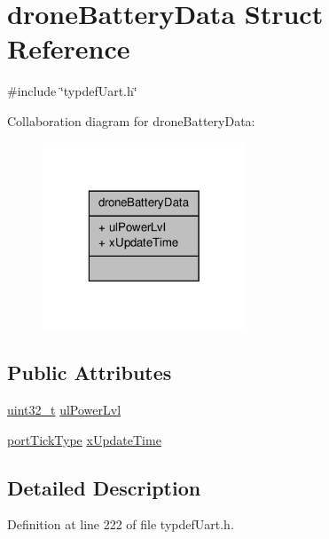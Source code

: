 \hypertarget{structdroneBatteryData}{\section{drone\-Battery\-Data Struct Reference}
\label{structdroneBatteryData}
}


{\ttfamily \#include \char`\"{}typdef\-Uart.\-h\char`\"{}}



Collaboration diagram for drone\-Battery\-Data\-:\nopagebreak
\begin{figure}[H]
\begin{center}
\leavevmode
\includegraphics[width=172pt]{structdroneBatteryData__coll__graph}
\end{center}
\end{figure}
\subsection*{Public Attributes}
\begin{DoxyCompactItemize}
\item 
\hyperlink{typdefUart_8h_a435d1572bf3f880d55459d9805097f62}{uint32\-\_\-t} \hyperlink{structdroneBatteryData_a789c02e04e8c2e46989309ff33c44b1d}{ul\-Power\-Lvl}
\item 
\hyperlink{typdefUart_8h_ae9fa5e001303f1be1c0294f26cde8caf}{port\-Tick\-Type} \hyperlink{structdroneBatteryData_a52ebc5b82ebb0220cff03229eb9c660f}{x\-Update\-Time}
\end{DoxyCompactItemize}


\subsection{Detailed Description}


Definition at line 222 of file typdef\-Uart.\-h.



